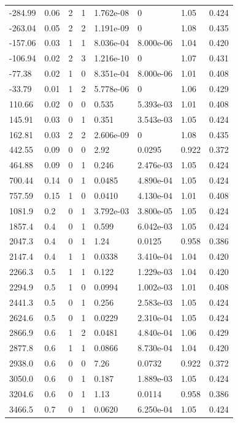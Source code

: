 \documentclass[preview]{standalone}
\begin{document}
{{\begin{tabular}{L{1.2cm}C{1.2cm} C{0.3cm}C{0.5cm} C{1.4cm}C{1.4cm} C{1.4cm}C{1.4cm}}
  -284.99  &  0.06  & 2     &  1 &  1.762e-08  & 0  & 1.05 &  0.424   \\ 
  -263.04  &  0.05  & 2     &  2 &  1.191e-09  & 0  & 1.08 &  0.435   \\ 
  -157.06  &  0.03  & 1     &  1 &  8.036e-04  & 8.000e-06  & 1.04 &  0.420   \\ 
  -106.94  &  0.02  & 2     &  3 &  1.216e-10  & 0  & 1.07 &  0.431   \\ 
  -77.38  &  0.02  & 1     &  0 &  8.351e-04  & 8.000e-06  & 1.01 &  0.408   \\ 
  -33.79  &  0.01  & 1     &  2 &  5.778e-06  & 0  & 1.06 &  0.429   \\ 
  110.66  &  0.02  & 0     &  0 &  0.535  & 5.393e-03  & 1.01 &  0.408   \\ 
  145.91  &  0.03  & 0     &  1 &  0.351  & 3.543e-03  & 1.05 &  0.424   \\ 
  162.81  &  0.03  & 2     &  2 &  2.606e-09  & 0  & 1.08 &  0.435   \\ 
  442.55  &  0.09  & 0     &  0 &  2.92  & 0.0295  & 0.922 &  0.372   \\ 
  464.88  &  0.09  & 0     &  1 &  0.246  & 2.476e-03  & 1.05 &  0.424   \\ 
  700.44  &  0.14  & 0     &  1 &  0.0485  & 4.890e-04  & 1.05 &  0.424   \\ 
  757.59  &  0.15  & 1     &  0 &  0.0410  & 4.130e-04  & 1.01 &  0.408   \\ 
  1081.9  &   0.2  & 0     &  1 &  3.792e-03  & 3.800e-05  & 1.05 &  0.424   \\ 
  1857.4  &   0.4  & 0     &  1 &  0.599  & 6.042e-03  & 1.05 &  0.424   \\ 
  2047.3  &   0.4  & 0     &  1 &  1.24  & 0.0125  & 0.958 &  0.386   \\ 
  2147.4  &   0.4  & 1     &  1 &  0.0338  & 3.410e-04  & 1.04 &  0.420   \\ 
  2266.3  &   0.5  & 1     &  1 &  0.122  & 1.229e-03  & 1.04 &  0.420   \\ 
  2294.9  &   0.5  & 1     &  0 &  0.0994  & 1.002e-03  & 1.01 &  0.408   \\ 
  2441.3  &   0.5  & 0     &  1 &  0.256  & 2.583e-03  & 1.05 &  0.424   \\ 
  2624.6  &   0.5  & 0     &  1 &  0.0229  & 2.310e-04  & 1.05 &  0.424   \\ 
  2866.9  &   0.6  & 1     &  2 &  0.0481  & 4.840e-04  & 1.06 &  0.429   \\ 
  2877.8  &   0.6  & 1     &  1 &  0.0866  & 8.730e-04  & 1.04 &  0.420   \\ 
  2938.0  &   0.6  & 0     &  0 &  7.26  & 0.0732  & 0.922 &  0.372   \\ 
  3050.0  &   0.6  & 0     &  1 &  0.187  & 1.889e-03  & 1.05 &  0.424   \\ 
  3204.6  &   0.6  & 0     &  1 &  1.13  & 0.0114  & 0.958 &  0.386   \\ 
  3466.5  &   0.7  & 0     &  1 &  0.0620  & 6.250e-04  & 1.05 &  0.424   \\ 
\hline 
\end{tabular} 

}}
\end{document}
